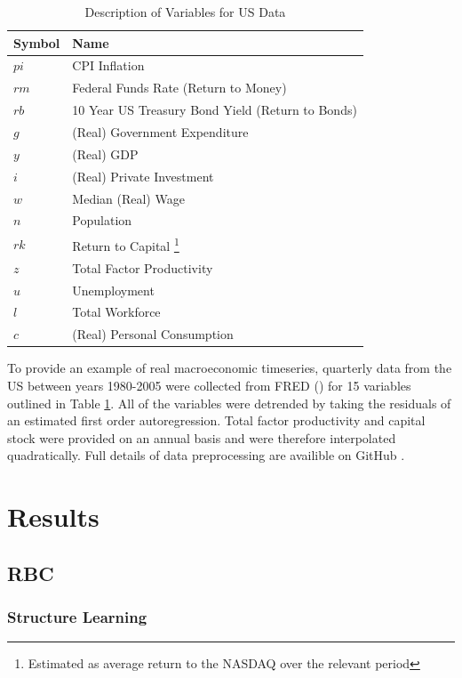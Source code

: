 \documentclass{article}
\begin{document}
\begin{table}
  \centering
  \begin{tabular}{|l|l|}
    \hline
    Symbol & Name \\
    \hline
    $pi$ & CPI Inflation \\
    $rm$ & Federal Funds Rate (Return to Money) \\
    $rb$ & 10 Year US Treasury Bond Yield (Return to Bonds)\\
    $g$ & (Real) Government Expenditure \\
    $y$ & (Real) GDP \\
    $i$ & (Real) Private Investment \\
    $w$ & Median (Real) Wage \\
    $n$ & Population \\
    $rk$ & Return to Capital \footnote{Estimated as average return to the NASDAQ over the relevant period} \\
    $z$ & Total Factor Productivity \\
    $u$ & Unemployment \\
    $l$ & Total Workforce \\
    $c$ & (Real) Personal Consumption \\\cline{2-2}
    \hline
  \end{tabular}
  \caption{Description of Variables for US Data}
  \label{tab3}
\end{table}

To provide an example of real macroeconomic timeseries, quarterly data from the US between years 1980-2005 were collected from FRED (\citeyear{fred2020data}) for 15 variables outlined in Table \ref{tab3}. All of the variables were detrended by taking the residuals of an estimated first order autoregression. Total factor productivity and capital stock were provided on an annual basis and were therefore interpolated quadratically. Full details of data preprocessing are availible on GitHub \parencite{hall2020git}.

\section{Results} \label{results}

\subsection{RBC}

\subsubsection{Structure Learning}
\end{document}
